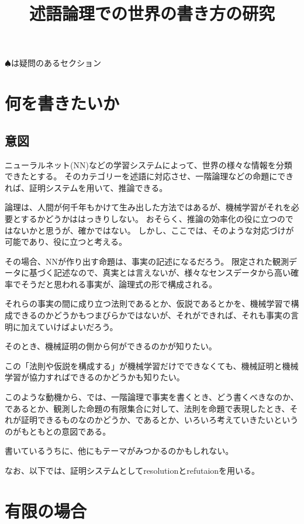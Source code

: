 \documentclass[10pt, oneside]{jarticle}   	%
\title{述語論理での世界の書き方の研究}
\author{\myname}
\begin{document}
\maketitle
\tableofcontents
$\spadesuit$は疑問のあるセクション
\newpage

\section{何を書きたいか}
\subsection{意図}
ニューラルネット(NN)などの学習システムによって、世界の様々な情報を分類できたとする。
そのカテゴリーを述語に対応させ、一階論理などの命題にできれば、証明システムを用いて、推論できる。

論理は、人間が何千年もかけて生み出した方法ではあるが、機械学習がそれを必要とするかどうかははっきりしない。
おそらく、推論の効率化の役に立つのではないかと思うが、確かではない。
しかし、ここでは、そのような対応づけが可能であり、役に立つと考える。

その場合、NNが作り出す命題は、事実の記述になるだろう。
限定された観測データに基づく記述なので、真実とは言えないが、様々なセンスデータから高い確率でそうだと思われる事実が、論理式の形で構成される。

それらの事実の間に成り立つ法則であるとか、仮説であるとかを、機械学習で構成できるのかどうかもつまびらかではないが、それができれば、それも事実の言明に加えていけばよいだろう。

そのとき、機械証明の側から何ができるのかが知りたい。

この「法則や仮説を構成する」が機械学習だけでできなくても、機械証明と機械学習が協力すればできるのかどうかも知りたい。

このような動機から、では、一階論理で事実を書くとき、どう書くべきなのか、であるとか、観測した命題の有限集合に対して、法則を命題で表現したとき、それが証明できるものなのかどうか、であるとか、いろいろ考えていきたいというのがもともとの意図である。

書いているうちに、他にもテーマがみつかるのかもしれない。

なお、以下では、証明システムとしてresolutionとrefutaionを用いる。




\newpage

\section{有限の場合}
\end{document}
